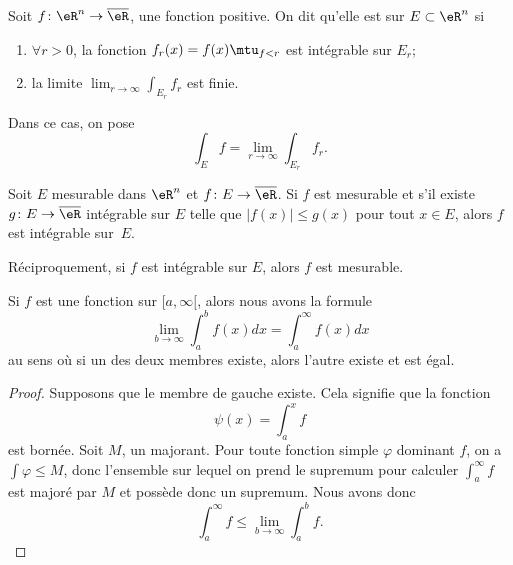 Soit $f\colon \eR^n\to \overline{ \eR }$, une fonction positive. On dit qu'elle est  sur $E\subset\eR^n$ si
\begin{enumerate}
    \item $\forall r>0$, la fonction $f_r(x)=f(x)\mtu_{f<r}$ est intégrable sur $E_r$;
\item la limite $\lim_{r\to\infty}\int_{E_r}f_r$ est finie.
\end{enumerate}
Dans ce cas, on pose
\begin{equation}
	\int_Ef=\lim_{r\to\infty}\int_{E_r}f_r.
\end{equation}

\begin{theorem}	\label{ThoFnTestIntnnBorn}
Soit $E$ mesurable dans $\eR^n$ et $f\colon E\to \overline{ \eR }$. Si $f$ est mesurable et s'il existe $g\colon E\to \overline{ \eR }$ intégrable sur $E$ telle que $| f(x) |\leq g(x)$ pour tout $x\in E$, alors $f$ est intégrable sur~$E$.

Réciproquement, si $f$ est intégrable sur $E$, alors $f$ est mesurable.
\end{theorem}

\begin{lemma}\label{LemTHBSEs}
    Si \( f\) est une fonction sur \( \mathopen[ a , \infty [\), alors nous avons la formule
    \begin{equation}
        \lim_{b\to \infty}\int_a^bf(x)dx=\int_a^{\infty}f(x)dx
    \end{equation}
    au sens où si un des deux membres existe, alors l'autre existe et est égal.
\end{lemma}

\begin{proof}
    Supposons que le membre de gauche existe. Cela signifie que la fonction
    \begin{equation}
        \psi(x)=\int_a^xf
    \end{equation}
    est bornée. Soit \( M\), un majorant. Pour toute fonction simple \( \varphi\) dominant \( f\), on a \( \int\varphi\leq M\), donc l'ensemble sur lequel on prend le supremum pour calculer \( \int_a^{\infty}f\) est majoré par \( M\) et possède donc un supremum. Nous avons donc
    \begin{equation}
        \int_a^{\infty}f\leq\lim_{b\to\infty}\int_a^bf.
    \end{equation}
\end{proof}
